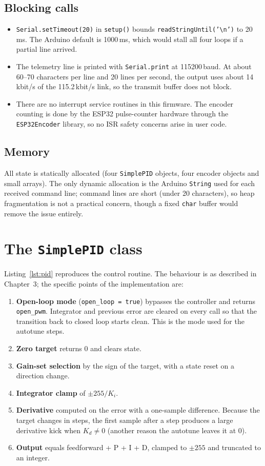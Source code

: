 \documentclass[11pt,a4paper]{report}
\newcommand{\code}[1]{\texttt{#1}}
\begin{document}
\subsection*{Blocking calls}
\begin{itemize}[noitemsep]
  \item \code{Serial.setTimeout(20)} in \code{setup()} bounds \code{readStringUntil('\textbackslash n')} to 20\,ms. The Arduino default is 1000\,ms, which would stall all four loops if a partial line arrived.
  \item The telemetry line is printed with \code{Serial.print} at 115200\,baud. At about 60--70 characters per line and 20 lines per second, the output uses about 14\,kbit/s of the 115.2\,kbit/s link, so the transmit buffer does not block.
  \item There are no interrupt service routines in this firmware. The encoder counting is done by the ESP32 pulse-counter hardware through the \code{ESP32Encoder} library, so no ISR safety concerns arise in user code.
\end{itemize}

\subsection*{Memory}
All state is statically allocated (four \code{SimplePID} objects, four encoder objects and small arrays). The only dynamic allocation is the Arduino \code{String} used for each received command line; command lines are short (under 20 characters), so heap fragmentation is not a practical concern, though a fixed \code{char} buffer would remove the issue entirely.

\section{The \texttt{SimplePID} class}
Listing~\ref{lst:pid} reproduces the control routine. The behaviour is as described in Chapter~3; the specific points of the implementation are:
\begin{enumerate}[noitemsep]
  \item \textbf{Open-loop mode} (\code{open\_loop = true}) bypasses the controller and returns \code{open\_pwm}. Integrator and previous error are cleared on every call so that the transition back to closed loop starts clean. This is the mode used for the autotune steps.
  \item \textbf{Zero target} returns 0 and clears state.
  \item \textbf{Gain-set selection} by the sign of the target, with a state reset on a direction change.
  \item \textbf{Integrator clamp} of $\pm255/K_i$.
  \item \textbf{Derivative} computed on the error with a one-sample difference. Because the target changes in steps, the first sample after a step produces a large derivative kick when $K_d \neq 0$ (another reason the autotune leaves it at 0).
  \item \textbf{Output} equals feedforward + P + I + D, clamped to $\pm255$ and truncated to an integer.
\end{enumerate}
\end{document}
